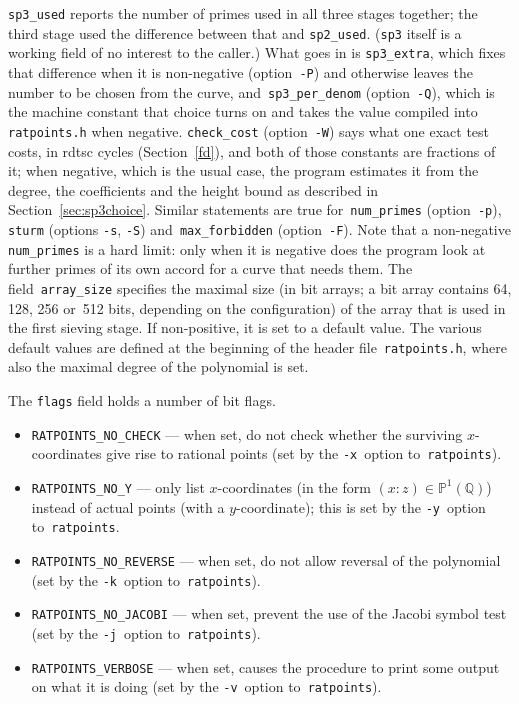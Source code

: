 \documentclass[12pt,a4paper,oneside]{amsart}
\newcommand{\Q}{{\mathbb Q}}
\newcommand{\BP}{{\mathbb P}}
\begin{document}
\texttt{sp3\_used}
reports the number of primes used in all three stages together; the third
stage used the difference between that and \texttt{sp2\_used}.
(\texttt{sp3} itself is a working field of no interest to the caller.)
What goes in is \texttt{sp3\_extra}, which fixes that difference when
it is non-negative (option~\verb+-P+) and otherwise leaves the number to be
chosen from the curve, and~\texttt{sp3\_per\_denom} (option~\verb+-Q+),
which is the machine constant that choice turns on and takes the value
compiled into \texttt{ratpoints.h} when negative. \texttt{check\_cost}
(option~\verb+-W+) says what one exact test costs, in rdtsc cycles
(Section~\ref{fd}), and both
of those constants are fractions of it; when negative, which is the usual
case, the program estimates it from the degree, the coefficients and the
height bound as described in Section~\ref{sec:sp3choice}.
Similar statements are true for~\texttt{num\_primes} (option~\verb+-p+),
\texttt{sturm} (options \verb+-s+, \verb+-S+) and~\texttt{max\_forbidden}
(option~\verb+-F+). Note that a non-negative \texttt{num\_primes} is a hard
limit: only when it is negative does the program look at further primes of
its own accord for a curve that needs them. The field~\texttt{array\_size} specifies the maximal size
(in bit arrays; a bit array
contains 64, 128, 256 or~512 bits, depending on the configuration) of the
array that is used in the first sieving stage. If non-positive, it is
set to a default value. The various default values are defined at the
beginning of the header file~\texttt{ratpoints.h}, where also the maximal
degree of the polynomial is set.

The \texttt{flags} field holds a number of bit flags.
\begin{itemize}
  \item \texttt{RATPOINTS\_NO\_CHECK} --- when set, do not check whether
        the surviving $x$-coordinates give rise to rational points
        (set by the \verb+-x+~option to~\texttt{ratpoints}).
  \item \texttt{RATPOINTS\_NO\_Y} --- only list $x$-coordinates (in the
        form $(x : z) \in \BP^1(\Q)$) instead of actual points (with
        a $y$-coordinate); this is set by the \verb+-y+~option
        to~\texttt{ratpoints}.
  \item \texttt{RATPOINTS\_NO\_REVERSE} --- when set, do not allow reversal
        of the polynomial (set by the \verb+-k+~option to~\texttt{ratpoints}).
  \item \texttt{RATPOINTS\_NO\_JACOBI} --- when set, prevent the use of the
        Jacobi symbol test (set by the \verb+-j+~option to~\texttt{ratpoints}).
  \item \texttt{RATPOINTS\_VERBOSE} --- when set, causes the procedure to
        print some output on what it is doing (set by the \verb+-v+~option
        to~\texttt{ratpoints}).
\end{itemize}
\end{document}
